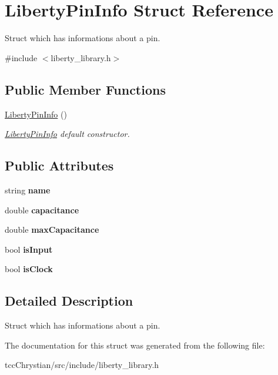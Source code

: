 \hypertarget{structLibertyPinInfo}{\section{Liberty\-Pin\-Info Struct Reference}
\label{structLibertyPinInfo}
}


Struct which has informations about a pin.  




{\ttfamily \#include $<$liberty\-\_\-library.\-h$>$}

\subsection*{Public Member Functions}
\begin{DoxyCompactItemize}
\item 
\hypertarget{structLibertyPinInfo_a268a64137463b6b6fdc87ed036184e45}{\hyperlink{structLibertyPinInfo_a268a64137463b6b6fdc87ed036184e45}{Liberty\-Pin\-Info} ()}\label{structLibertyPinInfo_a268a64137463b6b6fdc87ed036184e45}

\begin{DoxyCompactList}\small\item\em \hyperlink{structLibertyPinInfo}{Liberty\-Pin\-Info} default constructor. \end{DoxyCompactList}\end{DoxyCompactItemize}
\subsection*{Public Attributes}
\begin{DoxyCompactItemize}
\item 
\hypertarget{structLibertyPinInfo_a4421a56d0603f0d8371a48c123832aed}{string {\bfseries name}}\label{structLibertyPinInfo_a4421a56d0603f0d8371a48c123832aed}

\item 
\hypertarget{structLibertyPinInfo_a8668778fc79c36a4cdcedf9a3f7e91b4}{double {\bfseries capacitance}}\label{structLibertyPinInfo_a8668778fc79c36a4cdcedf9a3f7e91b4}

\item 
\hypertarget{structLibertyPinInfo_a8eb7d3102925e3ecf9906ade7c82b0b7}{double {\bfseries max\-Capacitance}}\label{structLibertyPinInfo_a8eb7d3102925e3ecf9906ade7c82b0b7}

\item 
\hypertarget{structLibertyPinInfo_a57daad21ecac17f40631e0c563f7f39d}{bool {\bfseries is\-Input}}\label{structLibertyPinInfo_a57daad21ecac17f40631e0c563f7f39d}

\item 
\hypertarget{structLibertyPinInfo_a8200642f454380e2e22f4158d471c302}{bool {\bfseries is\-Clock}}\label{structLibertyPinInfo_a8200642f454380e2e22f4158d471c302}

\end{DoxyCompactItemize}


\subsection{Detailed Description}
Struct which has informations about a pin. 

The documentation for this struct was generated from the following file\-:\begin{DoxyCompactItemize}
\item 
tcc\-Chrystian/src/include/liberty\-\_\-library.\-h\end{DoxyCompactItemize}
